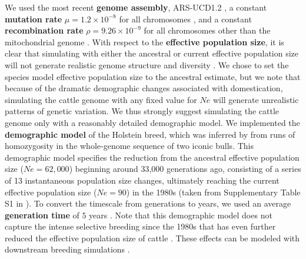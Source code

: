 \documentclass[hidelinks]{article}
\begin{document}
We used the most recent \textbf{genome assembly}, ARS-UCD1.2
\citep{Rosen2020}, a constant \textbf{mutation rate} \(\mu=1.2\times 10^{-8}\) for all chromosomes \citep{Harland2017}, 
and a constant \textbf{recombination rate} \(\rho=9.26 \times 10^{-9}\) for all chromosomes other than the mitochondrial genome \citep{Ma2015}.
%
With respect to the \textbf{effective population size}, it is clear that simulating with either 
the ancestral or current effective population size will not generate realistic genome structure and diversity \citep{MacLeod2013,Rosen2020}.
%
We chose to set the species model effective population size to the ancestral estimate, but we note that because of the dramatic demographic changes associated with domestication, simulating the cattle genome with any fixed value for $Ne$ will generate unrealistic patterns of genetic variation.
%
We thus strongly suggest simulating the cattle genome only with a reasonably detailed demographic model.
%
We implemented the \textbf{demographic model} of the Holstein breed, which was
inferred by \cite{MacLeod2013} from runs of homozygosity in the whole-genome sequence of two iconic bulls.
%
This demographic model specifies the reduction from the ancestral effective population size ($Ne=62,000$) beginning around 33,000 generations ago, consisting of a series of 13 instantaneous population size changes, ultimately reaching the current effective population size ($Ne=90$) in the 1980s (taken from Supplementary Table S1 in \cite{MacLeod2013}).
%
To convert the timescale from generations to years, we used an average \textbf{generation time} of $5$ years \citep{MacLeod2013}.
%
Note that this demographic model does not capture the intense selective breeding since the 1980s that has even further reduced the effective population size of cattle \citep{MacLeod2013, VanRaden2020, Makanjouloa2020}. These effects can be modeled with
downstream breeding simulations \citep[e.g.,][]{Gaynor2020}.
%
\end{document}
